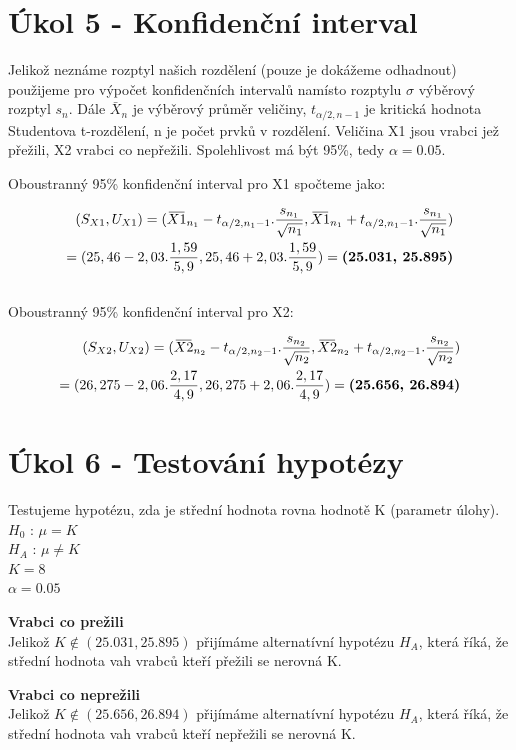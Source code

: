 \documentclass[12pt,a4paper]{article}
\newcommand{\overbar}[1]{\mkern 2.5mu\overline{\mkern-2.5mu#1\mkern-2.5mu}\mkern 2.5mu}
\begin{document}
\pagebreak

\section{Úkol 5 - Konfidenční interval}

Jelikož neznáme rozptyl našich rozdělení (pouze je dokážeme odhadnout) použijeme pro výpočet konfidenčních intervalů namísto rozptylu $\sigma$ výběrový rozptyl $s_n$. Dále $\bar{X}_n$ je výběrový průměr veličiny, $t_{\alpha/2,n-1}$ je kritická hodnota Studentova t-rozdělení, n je počet prvků v rozdělení. Veličina X1 jsou vrabci jež přežili, X2 vrabci co nepřežili.  Spolehlivost má být 95\%, tedy $\alpha = 0.05$.

Oboustranný 95\% konfidenční interval pro X1 spočteme jako:

\begin{gather}
\begin{align}
(S_{X1},U_{X1})
= (\overbar{X1}_{n_1} - t_{\alpha/2,n_1-1}.\frac{s_{n_1}}{\sqrt{n_1}},
   \overbar{X1}_{n_1} + t_{\alpha/2,n_1-1}.\frac{s_{n_1}}{\sqrt{n_1}}) \nonumber\\
= (25,46 - 2,03.\frac{1,59}{5,9},
   25,46 + 2,03.\frac{1,59}{5,9})
= \textbf{(25.031, 25.895)}
\end{align}
\end{gather}\\

Oboustranný 95\% konfidenční interval pro X2:

\begin{align}
(S_{X2},U_{X2}) = 
(\overbar{X2}_{n_2} - t_{\alpha/2,n_2-1}.\frac{s_{n_2}}{\sqrt{n_2}},
 \overbar{X2}_{n_2} + t_{\alpha/2,n_2-1}.\frac{s_{n_2}	}{\sqrt{n_2}}) \nonumber\\
= (26,275 - 2,06.\frac{2,17}{4,9},
   26,275 + 2,06.\frac{2,17}{4,9})
= \textbf{(25.656, 26.894)}
\end{align}

\section{Úkol 6 - Testování hypotézy}
Testujeme hypotézu, zda je střední hodnota rovna hodnotě K (parametr úlohy).\\[0.4cm]
$H_0$ : $\mu = K$\\
$H_A$ : $\mu \neq K$\\
$K = 8$\\
$\alpha = 0.05$\par \medskip
\textbf{Vrabci co prežili}\\
Jelikož $K \notin (25.031, 25.895)$ přijímáme alternatívní hypotézu $H_A$, která říká, že střední hodnota vah vrabců kteří přežili se nerovná K.
\par \medskip
\textbf{Vrabci co neprežili}\\
Jelikož $K \notin (25.656, 26.894)$ přijímáme alternatívní hypotézu $H_A$, která říká, že střední hodnota vah vrabců kteří nepřežili se nerovná K.
\pagebreak
\end{document}
